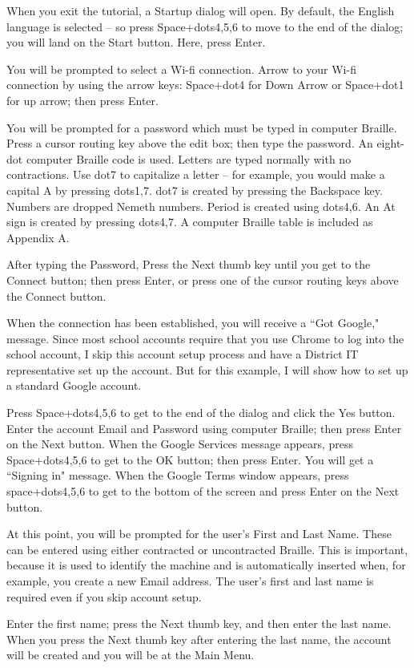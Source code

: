 \documentclass[10pt,letterpaper,twoside]{report}
\begin{document}
{{{When you exit the tutorial, a Startup dialog will open. By default, the English language is selected – so press Space+dots4,5,6 to move to the end of the dialog; you will land on the Start button. Here, press Enter.

You will be prompted to select a Wi-fi connection. Arrow to your Wi-fi connection by using the arrow keys: Space+dot4 for Down Arrow or Space+dot1 for up arrow; then press Enter.

You will be prompted for a password which must be typed in computer Braille. Press a cursor routing key above the edit box; then type the password. An eight-dot computer Braille code is used. Letters are typed normally with no contractions. Use dot7 to capitalize a letter – for example, you would make a capital A by pressing dots1,7. dot7 is created by pressing the Backspace key. Numbers are dropped Nemeth numbers. Period is created using dots4,6. An At sign is created by pressing dots4,7. A computer Braille table is included as Appendix A.

After typing the Password, Press the Next thumb key until you get to the Connect button; then press Enter, or press one of the cursor routing keys above the Connect button.

When the connection has been established, you will receive a ``Got Google," message. Since most school accounts require that you use Chrome to log into the school account, I skip this account setup process and have a District IT representative set up the account. But for this example, I will show how to set up a standard Google account.

Press Space+dots4,5,6 to get to the end of the dialog and click the Yes button.
Enter the account Email and Password using computer Braille; then press Enter on the Next button.
When the Google Services message appears, press Space+dots4,5,6 to get to the OK button; then press Enter. You will get a ``Signing in" message.
When the Google Terms window appears, press space+dots4,5,6 to get to the bottom of the screen and press Enter on the Next button.

At this point, you will be prompted for the user's First and Last Name. These can be entered using either contracted or uncontracted Braille. This is important, because it is used to identify the machine and is automatically inserted when, for example, you create a new Email address. The user's first and last name is required even if you skip account setup.

Enter the first name; press the Next thumb key, and then enter the last name. When you press the Next thumb key after entering the last name, the account will be created and you will be at the Main Menu.

}}}
\end{document}
